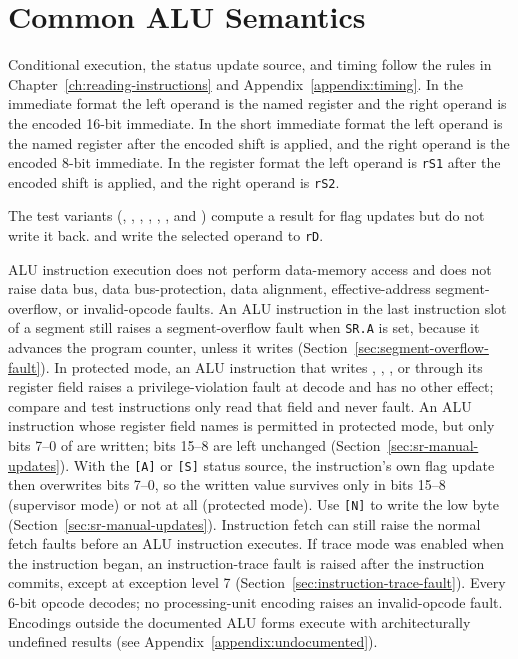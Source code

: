 \section{Common ALU Semantics}

Conditional execution, the status update source, and timing follow the rules in Chapter~\ref{ch:reading-instructions}
and Appendix~\ref{appendix:timing}. In the immediate format the left operand is the named register and the right
operand is the encoded 16-bit immediate. In the short immediate format the left operand is the named register after the
encoded shift is applied, and the right operand is the encoded 8-bit immediate. In the register format the left operand
is \texttt{rS1} after the encoded shift is applied, and the right operand is \texttt{rS2}.

The test variants (, , , , , , and
) compute a result for flag updates but do not write it back.  and  write
the selected operand to \texttt{rD}.

\noindent ALU instruction execution does not perform data-memory access and does not raise data bus, data
bus-protection, data alignment, effective-address segment-overflow, or invalid-opcode faults. An ALU instruction in the
last instruction slot of a segment still raises a segment-overflow fault when \texttt{SR.A} is set, because it
advances the program counter, unless it writes  (Section~\ref{sec:segment-overflow-fault}). In protected mode, an ALU instruction that
writes , , , or  through its register field raises a privilege-violation fault at
decode and has no other effect; compare and test instructions only read that field and never fault. An ALU instruction whose register field names  is permitted in protected mode, but only
bits 7--0 of  are written; bits 15--8 are left unchanged (Section~\ref{sec:sr-manual-updates}). With the \texttt{[A]} or \texttt{[S]} status source, the instruction's own flag update then overwrites bits 7--0, so the written value survives only in bits 15--8 (supervisor mode) or not at all (protected mode). Use \texttt{[N]} to write the low byte (Section~\ref{sec:sr-manual-updates}).
Instruction fetch can still raise the normal fetch faults before an ALU instruction executes.
If trace mode was enabled when the instruction began, an instruction-trace fault is raised after the instruction
commits, except at exception level 7 (Section~\ref{sec:instruction-trace-fault}). Every 6-bit opcode decodes; no processing-unit encoding raises an invalid-opcode fault. Encodings outside the
documented ALU forms execute with architecturally undefined results (see Appendix~\ref{appendix:undocumented}).

